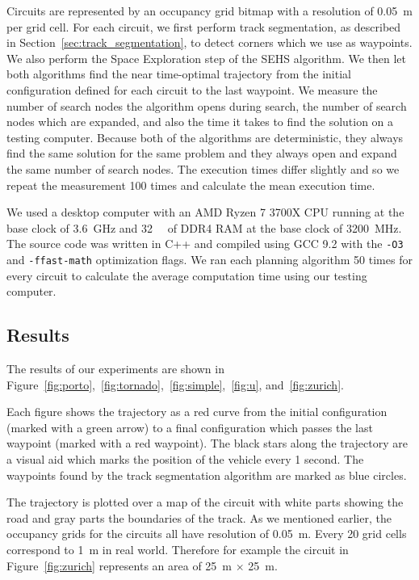 Circuits are represented by an occupancy grid bitmap with a resolution of \SI{0.05}{\meter} per grid cell. For each circuit, we first perform track segmentation, as described in Section~\ref{sec:track_segmentation}, to detect corners which we use as waypoints. We also perform the Space Exploration step of the SEHS algorithm. We then let both algorithms find the near time-optimal trajectory from the initial configuration defined for each circuit to the last waypoint. We measure the number of search nodes the algorithm opens during search, the number of search nodes which are expanded, and also the time it takes to find the solution on a testing computer. Because both of the algorithms are deterministic, they always find the same solution for the same problem and they always open and expand the same number of search nodes. The execution times differ slightly and so we repeat the measurement 100 times and calculate the mean execution time.

We used a desktop computer with an AMD Ryzen 7 3700X CPU running at the base clock of \SI{3.6}{\giga\hertz} and \SI{32}{\giga\byte} of DDR4 RAM at the base clock of \SI{3200}{\mega\hertz}. The source code was written in C++ and compiled using GCC 9.2 with the \texttt{-O3} and \texttt{-ffast-math} optimization flags. We ran each planning algorithm 50 times for every circuit to calculate the average computation time using our testing computer.

\subsection{Results}

The results of our experiments are shown in Figure~\ref{fig:porto},~\ref{fig:tornado},~\ref{fig:simple},~\ref{fig:u}, and~\ref{fig:zurich}.

Each figure shows the trajectory as a red curve from the initial configuration (marked with a green arrow) to a final configuration which passes the last waypoint (marked with a red waypoint). The black stars along the trajectory are a visual aid which marks the position of the vehicle every 1 second. The waypoints found by the track segmentation algorithm are marked as blue circles.

The trajectory is plotted over a map of the circuit with white parts showing the road and gray parts the boundaries of the track. As we mentioned earlier, the occupancy grids for the circuits all have resolution of \SI{0.05}{\meter}. Every \num{20} grid cells correspond to \SI{1}{\meter} in real world. Therefore for example the circuit in Figure~\ref{fig:zurich} represents an area of \SI{25}{\meter} $\times$ \SI{25}{\meter}.

